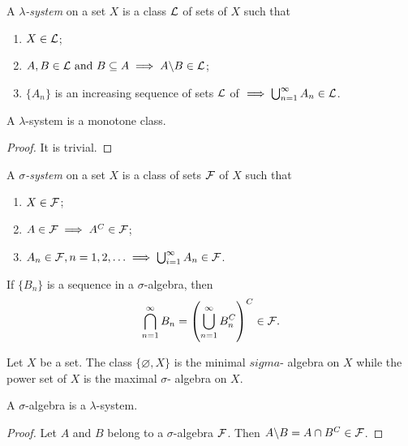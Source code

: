 \begin{defn}
A \emph{$\lambda$-system} on a set $X$ is a class $\mathcal{L}$ of sets of $X$ 
such that 
\begin{enumerate}
    \item $X \in \mathcal{L}$; 
    \item $A, B \in \mathcal{L} \text{ and } B \subseteq A 
    \implies A \backslash B \in \mathcal{L}$; 
    \item $\{A_n\}$ is an increasing sequence of sets $\mathcal{L}$ of $\implies 
    \bigcup_{n=1}^\infty A_n \in \mathcal{L}$. 
\end{enumerate}
\end{defn}

\begin{prop}
A $\lambda$-system is a monotone class. 
\end{prop}
\begin{proof}
It is trivial. 
\end{proof}

\begin{defn}
A \emph{$\sigma$-system} on a set $X$ is a class of sets $\mathcal{F}$ of $X$ 
such that 
\begin{enumerate}
    \item $X \in \mathcal{F}$; 
    \item $A \in \mathcal{F} \implies A^C \in \mathcal{F}$; 
    \item $A_n \in \mathcal{F}, n = 1, 2, \ldots 
    \implies \bigcup_{i=1}^\infty A_n \in \mathcal{F}$. 
\end{enumerate}
\end{defn}
If $\{B_n\}$ is a sequence in a $\sigma$-algebra, then 
\begin{equation*}
    \bigcap_{n=1}^\infty B_n = \left( \bigcup_{n=1}^\infty B_n^C \right)^C 
    \in \mathcal{F}. 
\end{equation*}

\begin{example}
Let $X$ be a set. The class $\{\varnothing, X\}$ is the minimal $sigma$-
algebra on $X$ while the power set of $X$ is the maximal $\sigma$-
algebra on $X$. 
\end{example}

\begin{prop}
A $\sigma$-algebra is a $\lambda$-system. 
\end{prop}
\begin{proof}
Let $A$ and $B$ belong to a $\sigma$-algebra $\mathcal{F}$. 
Then $A \backslash B = A \cap B^C \in \mathcal{F}$. 
\end{proof}

